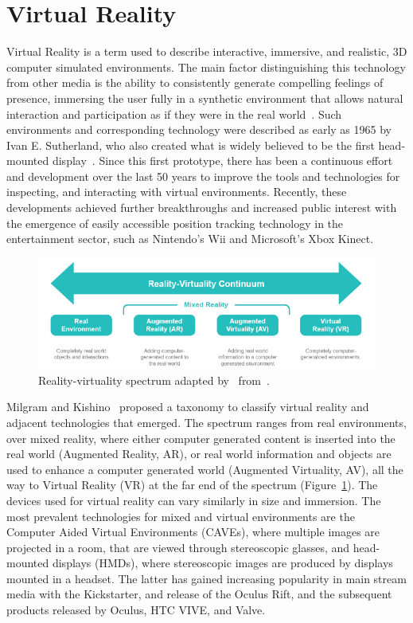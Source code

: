 \section{Virtual Reality}\label{sec:virtual-reality}

Virtual Reality is a term used to describe interactive, immersive, and realistic, 3D computer simulated environments.
The main factor distinguishing this technology from other media is the ability to consistently generate compelling
feelings of presence, immersing the user fully in a synthetic environment that allows natural interaction and
participation as if they were in the real world~\cite{Davis2014}.
Such environments and corresponding technology were described as early as 1965 by Ivan E. Sutherland, who also created
what is widely believed to be the first head-mounted display~\cite{Sutherland1968}.
Since this first prototype, there has been a continuous effort and development over the last 50 years to improve the
tools and technologies for inspecting, and interacting with virtual environments.
Recently, these developments achieved further breakthroughs and increased public interest with the emergence of
easily accessible position tracking technology in the entertainment sector, such as Nintendo's Wii and Microsoft's
Xbox Kinect.

\begin{figure}[h]
    \centering
    \includegraphics[width=\textwidth]{content/2_1_virtual_reality/img/reality-virtuality-continuum[Spivak2015]}
    \caption{Reality-virtuality spectrum adapted by~\cite{Spivak2015} from~\cite{Milgram1994}.}
    \label{fig:environment-spectrum}
\end{figure}

Milgram and Kishino~\cite{Milgram1994} proposed a taxonomy to classify virtual reality and adjacent technologies that
emerged.
The spectrum ranges from real environments, over mixed reality, where either computer generated content is inserted
into the real world (Augmented Reality, AR), or real world information and objects are used to enhance a computer
generated world (Augmented Virtuality, AV), all the way to Virtual Reality (VR) at the far end of the spectrum
(Figure~\ref{fig:environment-spectrum}).
The devices used for virtual reality can vary similarly in size and immersion.
The most prevalent technologies for mixed and virtual environments are the Computer Aided Virtual Environments (CAVEs),
where multiple images are projected in a room, that are viewed through stereoscopic glasses, and head-mounted
displays (HMDs), where stereoscopic images are produced by displays mounted in a headset.
The latter has gained increasing popularity in main stream media with the Kickstarter, and release of the Oculus Rift,
and the subsequent products released by Oculus, HTC VIVE, and Valve.

